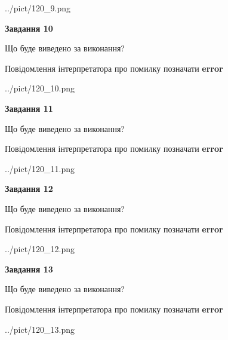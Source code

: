 \documentclass[11pt, ukrainian]{article}
\begin{document}
{\begin {large}
\begin{center}
	{../pict/120_9.png}
\end{center}
\newpage

{\begin {center}\textbf{Завдання 10}\end {center}}\par
Що буде виведено за виконання? \par
Повідомлення інтерпретатора про помилку позначати \textbf{error}

\begin{center}
	{../pict/120_10.png}
\end{center}
\newpage

{\begin {center}\textbf{Завдання 11}\end {center}}\par
Що буде виведено за виконання? \par
Повідомлення інтерпретатора про помилку позначати \textbf{error}

\begin{center}
	{../pict/120_11.png}
\end{center}
\newpage

{\begin {center}\textbf{Завдання 12}\end {center}}\par
Що буде виведено за виконання? \par
Повідомлення інтерпретатора про помилку позначати \textbf{error}

\begin{center}
	{../pict/120_12.png}
\end{center}
\newpage

{\begin {center}\textbf{Завдання 13}\end {center}}\par
Що буде виведено за виконання? \par
Повідомлення інтерпретатора про помилку позначати \textbf{error}

\begin{center}
	{../pict/120_13.png}
\end{center}
\newpage


\end{large}}
\end{document}
